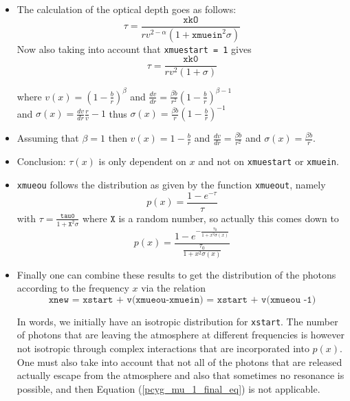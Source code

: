 \documentclass[../main/main.tex]{subfiles}
\begin{document}
\begin{itemize}
\item The calculation of the optical depth goes as follows:
\begin{equation}
\tau = \frac{\texttt{xkO}}{rv^{2-\alpha}(1+\texttt{xmuein}^2 \sigma)}
\end{equation}
Now also taking into account that \texttt{xmuestart = 1} gives
\begin{equation}
\tau = \frac{\texttt{xk0}}{rv^2(1+\sigma)}
\end{equation}

where $\boxed{v(x) = \left(1 - \frac{b}{r} \right)^{\beta}}$ 
\quad and $\frac{dv}{dr} = \frac{\beta b}{r^2}\left( 1 - \frac{b}{r} \right)^{\beta - 1}$  \\
and $\sigma(x) = \frac{dv}{dr}\frac{r}{v}-1$ 
thus $\boxed{\sigma(x) = \frac{\beta b}{r}\left( 1-\frac{b}{r}\right)^{-1}}$

\item Assuming that $\beta = 1$ then $\boxed{v(x) = 1 - \frac{b}{r}}$ and $\frac{dv}{dr} = \frac{\beta b}{r^2}$ and $\boxed{\sigma(x) = \frac{\beta b}{r}}$.

\item Conclusion: $\tau(x)$ is only dependent on $x$ and not on \texttt{xmuestart} or \texttt{xmuein}.

\item \texttt{xmueou} follows the distribution as given by the function \texttt{xmueout}, namely
\begin{equation}
p(x) = \frac{1-e^{-\tau}}{\tau}
\end{equation}
with $\tau = \frac{\texttt{tau0}}{1+\texttt{X}^2 \sigma}$ where $\texttt{X}$ is a random number, so actually this comes down to
\begin{equation}
\boxed{p(x) = \frac{1-e^{-\frac{\tau_0}{1+x^2\sigma(x)}}}{\frac{\tau_0}{1+x^ 2\sigma(x)}}}
\end{equation}

\item Finally one can combine these results to get the distribution of the photons according to the frequency $x$ via the relation 
\begin{equation}
\texttt{xnew = xstart + v(xmueou-xmuein) = xstart + v(xmueou -1)}
\label{pcyg_mu_1_final_eq}
\end{equation}

In words, we initially have an isotropic distribution for \texttt{xstart}. The number of photons that are leaving the atmosphere at different frequencies is however not isotropic through complex interactions that are incorporated into $p(x)$.
One must also take into account that not all of the photons that are released actually escape from the atmosphere and also that sometimes no resonance is possible, and then Equation (\ref{pcyg_mu_1_final_eq}) is not applicable.


\end{itemize}
\end{document}
